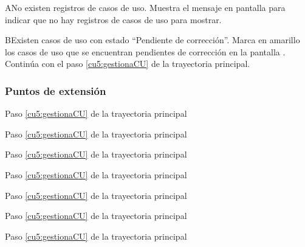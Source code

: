  \begin{UCtrayectoriaA}{A}{No existen registros de casos de uso.}
    \UCpaso[\UCsist] Muestra el mensaje  en pantalla  
    para indicar que no hay registros de casos de uso para mostrar.
 \end{UCtrayectoriaA}
 
 \begin{UCtrayectoriaA}{B}{Existen casos de uso con estado ``Pendiente de corrección''.}
    \UCpaso[\UCsist] Marca en amarillo los casos de uso que se encuentran pendientes de corrección en la pantalla .
    \UCpaso[] Continúa con el paso \ref{cu5:gestionaCU} de la trayectoria principal.
	
 \end{UCtrayectoriaA}
 

\subsubsection{Puntos de extensión}

	{Paso \ref{cu5:gestionaCU} de la trayectoria principal}
	{}

	{Paso \ref{cu5:gestionaCU} de la trayectoria principal}
	{}
	
	{Paso \ref{cu5:gestionaCU} de la trayectoria principal}
	{}
	
	{Paso \ref{cu5:gestionaCU} de la trayectoria principal}
	{}

	{Paso \ref{cu5:gestionaCU} de la trayectoria principal}
	{}
	
	{Paso \ref{cu5:gestionaCU} de la trayectoria principal}
	{}
	
	{Paso \ref{cu5:gestionaCU} de la trayectoria principal}
	{}
	
